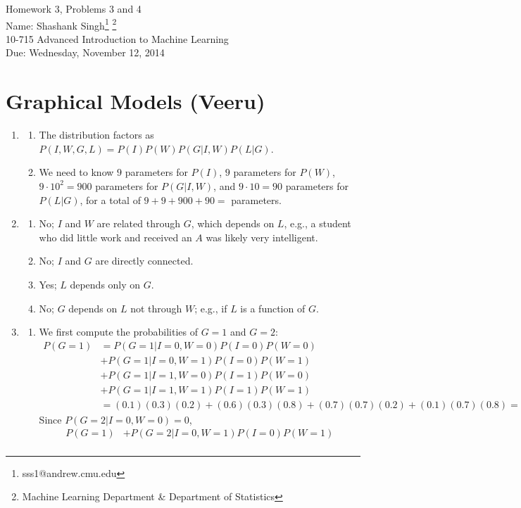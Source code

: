 \documentclass[11pt]{article}
\makeatletter
\newcommand{\myname}{Shashank Singh\footnote{sss1@andrew.cmu.edu}
        \footnote{Machine Learning Department \& Department of Statistics}}
\newcommand{\myclass}{10-715 Advanced Introduction to Machine Learning}
\newcommand{\myhwnum}{3}
\newcommand{\duedate}{Wednesday, November 12, 2014}
\makeatother
\begin{document}
\newpage
{\Large Homework \myhwnum, Problems 3 and 4} \\
Name: \myname \\
\myclass \\
Due: \duedate

\section{Graphical Models (Veeru)}
\begin{enumerate}
\item
\begin{enumerate}
\item The distribution factors as $P(I,W,G,L) = P(I)P(W)P(G|I,W)P(L|G)$.
\item We need to know $9$ parameters for $P(I)$, $9$ parameters for $P(W)$,
$9 \cdot 10^2 = 900$ parameters for $P(G|I,W)$, and $9 \cdot 10 = 90$
parameters for $P(L|G)$, for a total of $9 + 9 + 900 + 90 = $
parameters.
\end{enumerate}
\item
\begin{enumerate}
\item No; $I$ and $W$ are related through $G$, which depends on $L$, e.g., a
student who did little work and received an $A$ was likely very intelligent.
\item No; $I$ and $G$ are directly connected.
\item Yes; $L$ depends only on $G$.
\item No; $G$ depends on $L$ not through $W$; e.g., if $L$ is a function of
$G$.
\end{enumerate}
\item
\begin{enumerate}
\item We first compute the probabilities of $G = 1$ and $G = 2$:
\begin{align*}
P(G = 1)
 &  = P(G = 1 | I = 0, W = 0)P(I = 0)P(W = 0)   \\
 &  + P(G = 1 | I = 0, W = 1)P(I = 0)P(W = 1)   \\
 &  + P(G = 1 | I = 1, W = 0)P(I = 1)P(W = 0)   \\
 &  + P(G = 1 | I = 1, W = 1)P(I = 1)P(W = 1)   \\
 &  = (0.1)(0.3)(0.2)
    + (0.6)(0.3)(0.8)
    + (0.7)(0.7)(0.2)
    + (0.1)(0.7)(0.8)
    = 0.304.
\end{align*}
Since $P(G = 2 | I = 0, W = 0) = 0$,
\begin{align*}
P(G = 1)
 &  + P(G = 2 | I = 0, W = 1)P(I = 0)P(W = 1)   \\

\end{align*}
\end{enumerate}
\end{enumerate}
\end{document}
